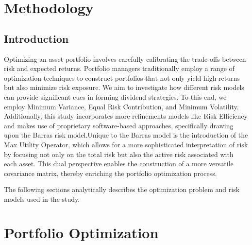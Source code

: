 \documentclass[12pt,preprint, authoryear]{elsarticle}
\numberwithin{equation}{section}
\numberwithin{figure}{section}
\numberwithin{table}{section}
\begin{document}
\hypertarget{methodology}{%
\section{Methodology}\label{methodology}}

\hypertarget{introduction-1}{%
\subsection{Introduction}\label{introduction-1}}

Optimizing an asset portfolio involves carefully calibrating the
trade-offs between risk and expected returns. Portfolio managers
traditionally employ a range of optimization techniques to construct
portfolios that not only yield high returns but also minimize risk
exposure. We aim to investigate how different risk models can provide
significant cues in forming dividend strategies. To this end, we employ
Minimum Variance, Equal Risk Contribution, and Minimum Volatility.
Additionally, this study incorporates more refinements models like Risk
Efficiency and makes use of proprietary software-based approaches,
specifically drawing upon the Barras risk model.Unique to the Barras
model is the introduction of the Max Utility Operator, which allows for
a more sophisticated interpretation of risk by focusing not only on the
total risk but also the active risk associated with each asset. This
dual perspective enables the construction of a more versatile covariance
matrix, thereby enriching the portfolio optimization process.

The following sections analytically describes the optimization problem
and risk models used in the study.

\hypertarget{portfolio-optimization}{%
\section{Portfolio Optimization}\label{portfolio-optimization}}
\end{document}
